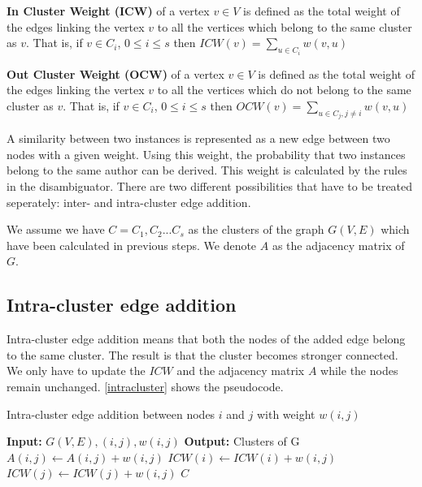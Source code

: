 \begin{mydef}
\textbf{In Cluster Weight (ICW)} of a vertex $v \in V$ is defined as the total weight of the edges linking the vertex $v$ to all the vertices which belong to the same cluster as $v$. That is, if $v \in C_i$, $0 \leq i \leq s$ then $ICW(v) = \sum_{u \in C_i}{w(v,u)}$
\end{mydef}

\begin{mydef}
\textbf{Out Cluster Weight (OCW)} of a vertex $v \in V$ is defined as the total weight of the edges linking the vertex $v$ to all the vertices which do not belong to the same cluster as $v$. That is, if $v \in C_i$, $0 \leq i \leq s$ then $OCW(v) = \sum_{u \in C_j, j \neq i}{w(v,u)}$
\end{mydef}

A similarity between two instances is represented as a new edge between two nodes with a given weight. Using this weight, the probability that two instances belong to the same author can be derived. This weight is calculated by the rules in the disambiguator. There are two different possibilities that have to be treated seperately: inter- and intra-cluster edge addition.

We assume we have $C = {C_1,C_2...C_s}$ as the clusters of the graph $G(V,E)$ which have been calculated in previous steps. We denote $A$ as the adjacency matrix of $G$.

\subsection{Intra-cluster edge addition}

Intra-cluster edge addition means that both the nodes of the added edge belong to the same cluster. The result is that the cluster becomes stronger connected. We only have to update the $ICW$ and the adjacency matrix $A$ while the nodes remain unchanged. \autoref{intracluster} shows the pseudocode.

\begin{algorithm}
\caption{Intra-cluster edge addition between nodes $i$ and $j$ with weight $w(i,j)$}
\label{intracluster}
\begin{algorithmic}
\STATE \textbf{Input:} $G(V,E), (i,j), w(i,j)$ 
\STATE \textbf{Output:} Clusters of G
\STATE $A(i,j) \leftarrow A(i,j) + w(i,j)$
\STATE $ICW(i) \leftarrow ICW(i) + w(i,j)$
\STATE $ICW(j) \leftarrow ICW(j) + w(i,j)$
\RETURN $C$
\end{algorithmic}
\end{algorithm}

